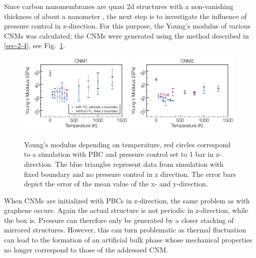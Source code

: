 \documentclass[preprint,12pt]{elsarticle}
\newcommand{\figref}[1]{Fig.~\protect\ref{#1}}
\begin{document}
Since carbon nanomembranes are quasi 2d structures with a non-vanishing 
thickness of about a nanometer \cite{YDB:AN18}, the next step is 
to investigate the influence of pressure control in z-direction. 
For this purpose, the Young's modulus of various CNMs was calculated; 
the CNMs were generated using the method described in \ref{sec-2-4}, see \figref{CNM_sumup}.

\begin{figure}[ht!]
\centering
\includegraphics[width=0.49\textwidth]{YM4CNM-f-8a.pdf}
\includegraphics[width=0.49\textwidth]{YM4CNM-f-8b.pdf}
\caption{Young's modulus depending on temperature, red circles correspond to a simulation 
with PBC and pressure control set to 1 bar in z-direction. 
The blue triangles represent data from simulation with fixed boundary 
and no pressure control in z direction. The error bars depict the error 
of the mean value of the x- and y-direction.\label{CNM_sumup}}
\end{figure}

When CNMs are initialized with PBCs in z-direction, the same problem as with graphene occurs. 
Again the actual structure is not periodic in z-direction, while the box is. 
Pressure can therefore only be generated 
by a closer stacking of mirrored structures. However, this can turn problematic
as thermal fluctuation can lead to the formation of an artificial bulk phase
whose mechanical properties no longer correspond to those of the addressed CNM. 
\end{document}
